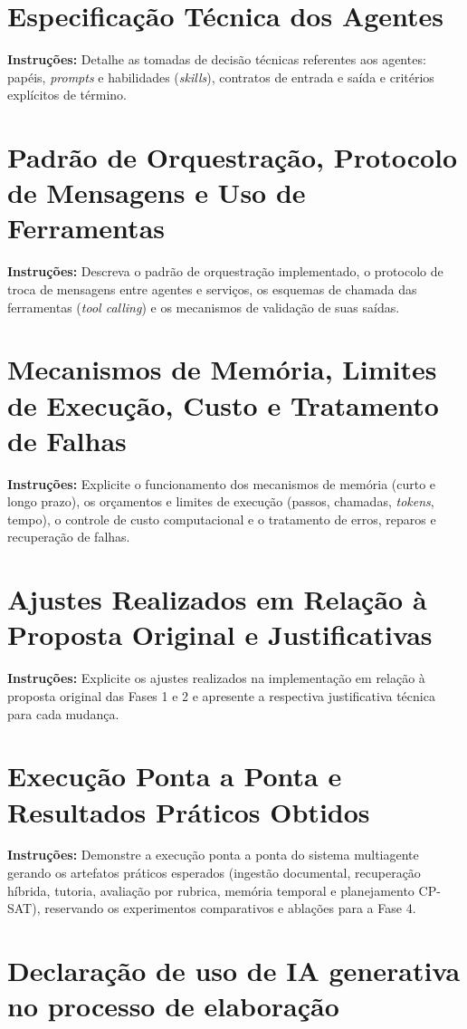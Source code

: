 \documentclass[12pt,a4paper]{article}
\newcommand{\dica}[1]{%
  \begin{instrucao}
  \small\textcolor{gray!80!black}{\textbf{Instruções:} #1}
  \end{instrucao}
}
\begin{document}
\section{Especificação Técnica dos Agentes}
\label{sec:especificacao-agentes}
\dica{Detalhe as tomadas de decisão técnicas referentes aos agentes: papéis, \textit{prompts} e habilidades (\textit{skills}), contratos de entrada e saída e critérios explícitos de término.}

\section{Padrão de Orquestração, Protocolo de Mensagens e Uso de Ferramentas}
\label{sec:orquestracao-ferramentas}
\dica{Descreva o padrão de orquestração implementado, o protocolo de troca de mensagens entre agentes e serviços, os esquemas de chamada das ferramentas (\textit{tool calling}) e os mecanismos de validação de suas saídas.}

\section{Mecanismos de Memória, Limites de Execução, Custo e Tratamento de Falhas}
\label{sec:memoria-limites-falhas}
\dica{Explicite o funcionamento dos mecanismos de memória (curto e longo prazo), os orçamentos e limites de execução (passos, chamadas, \textit{tokens}, tempo), o controle de custo computacional e o tratamento de erros, reparos e recuperação de falhas.}

\section{Ajustes Realizados em Relação à Proposta Original e Justificativas}
\label{sec:ajustes}
\dica{Explicite os ajustes realizados na implementação em relação à proposta original das Fases 1 e 2 e apresente a respectiva justificativa técnica para cada mudança.}

\section{Execução Ponta a Ponta e Resultados Práticos Obtidos}
\label{sec:resultados-praticos}
\dica{Demonstre a execução ponta a ponta do sistema multiagente gerando os artefatos práticos esperados (ingestão documental, recuperação híbrida, tutoria, avaliação por rubrica, memória temporal e planejamento CP-SAT), reservando os experimentos comparativos e ablações para a Fase 4.}

\section*{Declaração de uso de IA generativa no processo de elaboração}



\end{document}
